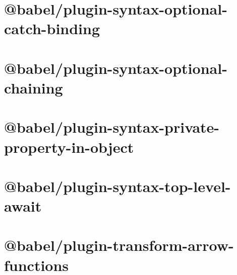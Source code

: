 \documentclass[twoside]{book}
\newcommand{\+}{\discretionary{\mbox{\scriptsize$\hookleftarrow$}}{}{}}
\begin{document}
\chapter{@babel/plugin-\/syntax-\/optional-\/catch-\/binding}
\label{md__c___users_vaishnavi_jadhav__desktop__developer_code_mean_stack_example_client_node_modules__c87001dde226b30a9addf26491bebf7b}

\chapter{@babel/plugin-\/syntax-\/optional-\/chaining}
\label{md__c___users_vaishnavi_jadhav__desktop__developer_code_mean_stack_example_client_node_modules__c68a89e85137f0050aedd90b051226dd}

\chapter{@babel/plugin-\/syntax-\/private-\/property-\/in-\/object}
\label{md__c___users_vaishnavi_jadhav__desktop__developer_code_mean_stack_example_client_node_modules__40b342976bf410603f1274c077972738}

\chapter{@babel/plugin-\/syntax-\/top-\/level-\/await}
\label{md__c___users_vaishnavi_jadhav__desktop__developer_code_mean_stack_example_client_node_modules__c679cb3bd702272aaed3daabacea12d1}

\chapter{@babel/plugin-\/transform-\/arrow-\/functions}
\label{md__c___users_vaishnavi_jadhav__desktop__developer_code_mean_stack_example_client_node_modules__fa0aca6fad71112a5d94640820a521f7}

\end{document}
